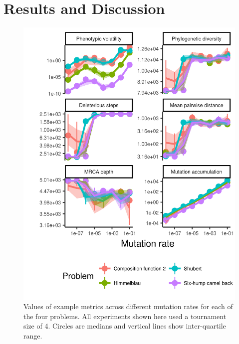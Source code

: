 \documentclass[letterpaper]{article}
\begin{document}
\section{Results and Discussion}


\begin{figure}
\includegraphics[width=7in]{figs/all_mutation_rate.png}
\caption{Values of example metrics across different mutation rates for each of the four problems. All experiments shown here used a tournament size of 4. Circles are medians and vertical lines show inter-quartile range.}
\label{fig:mutation_rate}
\end{figure}
\end{document}
